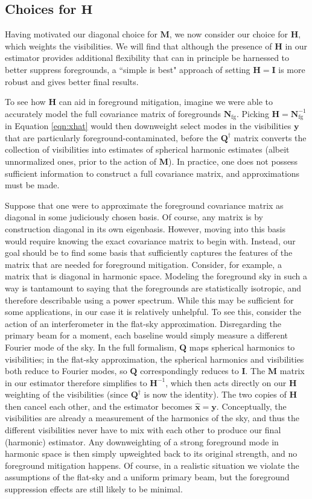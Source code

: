 \documentclass[twocolumn,apj,numberedappendix]{emulateapj}
\newcommand{\xhat}{\hat{\mathbf{x}}}
\newcommand{\y}{\mathbf{y}}
\newcommand{\Hmat}{\mathbf{H}}
\newcommand{\Nfg}{\mathbf{N}_{\textrm{fg}}}
\newcommand{\Q}{\mathbf{Q}}
\newcommand{\M}{\mathbf{M}}
\begin{document}
\subsection{Choices for $\Hmat$}

Having motivated our diagonal choice for $\M$, we now consider our choice for $\Hmat$, which weights the visibilities. We will find that although the presence of $\Hmat$ in our estimator provides additional flexibility that can in principle be harnessed to better suppress foregrounds, a ``simple is best" approach of setting $\Hmat = \mathbf{I}$ is more robust and gives better final results.

To see how $\Hmat$ can aid in foreground mitigation, imagine we were able to accurately model the full covariance matrix of foregrounds $\mathbf{N}_\textrm{fg}$. Picking $\Hmat = \Nfg^{-1}$ in Equation \eqref{eqn:xhat} would then downweight select modes in the visibilities $\y$ that are particularly foreground-contaminated, before the $\Q^\dagger$ matrix converts the collection of visibilities into estimates of spherical harmonic estimates (albeit unnormalized ones, prior to the action of $\M$). In practice, one does not possess sufficient information to construct a full covariance matrix, and approximations must be made.

Suppose that one were to approximate the foreground covariance matrix as diagonal in some judiciously chosen basis. Of course, any matrix is by construction diagonal in its own eigenbasis. However, moving into this basis would require knowing the exact covariance matrix to begin with. Instead, our goal should be to find some basis that sufficiently captures the features of the matrix that are needed for foreground mitigation. Consider, for example, a matrix that is diagonal in harmonic space. Modeling the foreground sky in such a way is tantamount to saying that the foregrounds are statistically isotropic, and therefore describable using a power spectrum. While this may be sufficient for some applications, in our case it is relatively unhelpful. To see this, consider the action of an interferometer in the flat-sky approximation.  Disregarding the primary beam for a moment, each baseline would simply measure a different Fourier mode of the sky. In the full formalism, $\Q$ maps spherical harmonics to visibilities; in the flat-sky approximation, the spherical harmonics and visibilities both reduce to Fourier modes, so $\Q$ correspondingly reduces to $\mathbf{I}$. The $\M$ matrix in our estimator therefore simplifies to $\Hmat^{-1}$, which then acts directly on our $\Hmat$ weighting of the visibilities (since $\Q^\dagger$ is now the identity). The two copies of $\Hmat$ then cancel each other, and the estimator becomes $\xhat = \y$. Conceptually, the visibilities are already a measurement of the harmonics of the sky, and thus the different visibilities never have to mix with each other to produce our final (harmonic) estimator. Any downweighting of a strong foreground mode in harmonic space is then simply upweighted back to its original strength, and no foreground mitigation happens. Of course, in a realistic situation we violate the assumptions of the flat-sky and a uniform primary beam, but the foreground suppression effects are still likely to be minimal.
\end{document}
